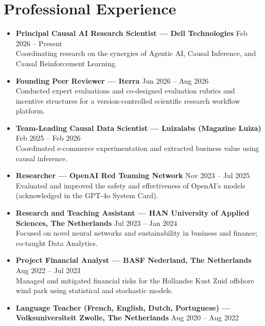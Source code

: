 \documentclass[10pt,a4paper]{article}
\newcommand{\cvitem}[2]{\textbf{#1} \hfill {\small\color{muted}#2}\\}
\begin{document}
\section{Professional Experience}
\begin{itemize}
    \item \cvitem{Principal Causal AI Research Scientist --- Dell Technologies}{Feb 2026 -- Present}
    Coordinating research on the synergies of Agentic AI, Causal Inference, and Causal Reinforcement Learning.
    \item \cvitem{Founding Peer Reviewer --- Iterra}{Jun 2026 -- Aug 2026}
    Conducted expert evaluations and co-designed evaluation rubrics and incentive structures for a version-controlled scientific research workflow platform.
    \item \cvitem{Team-Leading Causal Data Scientist --- Luizalabs (Magazine Luiza)}{Feb 2025 -- Feb 2026}
    Coordinated e-commerce experimentation and extracted business value using causal inference.
    \item \cvitem{Researcher --- OpenAI Red Teaming Network}{Nov 2023 -- Jul 2025}
    Evaluated and improved the safety and effectiveness of OpenAI's models (acknowledged in the GPT-4o System Card).
    \item \cvitem{Research and Teaching Assistant --- HAN University of Applied Sciences, The Netherlands}{Jul 2023 -- Jan 2024}
    Focused on novel neural networks and sustainability in business and finance; co-taught Data Analytics.
    \item \cvitem{Project Financial Analyst --- BASF Nederland, The Netherlands}{Aug 2022 -- Jul 2023}
    Managed and mitigated financial risks for the Hollandse Kust Zuid offshore wind park using statistical and stochastic models.
    \ifshortcv\else
    \item \cvitem{Language Teacher (French, English, Dutch, Portuguese) --- Volksuniversiteit Zwolle, The Netherlands}{Aug 2020 -- Aug 2022}
    \fi
\end{itemize}

\end{document}
